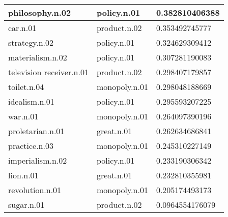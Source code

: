 \begin{center}
\begin{tabular}{ | l | l | l |}
philosophy.n.02 & policy.n.01 & 0.382810406388\\ \hline
car.n.01 & product.n.02 & 0.353492745777\\ \hline
strategy.n.02 & policy.n.01 & 0.324629309412\\ \hline
materialism.n.02 & policy.n.01 & 0.307281190083\\ \hline
television receiver.n.01 & product.n.02 & 0.298407179857\\ \hline
toilet.n.04 & monopoly.n.01 & 0.298048188669\\ \hline
idealism.n.01 & policy.n.01 & 0.295593207225\\ \hline
war.n.01 & monopoly.n.01 & 0.264097390196\\ \hline
proletarian.n.01 & great.n.01 & 0.262634686841\\ \hline
practice.n.03 & monopoly.n.01 & 0.245310227149\\ \hline
imperialism.n.02 & policy.n.01 & 0.233190306342\\ \hline
lion.n.01 & great.n.01 & 0.232810355981\\ \hline
revolution.n.01 & monopoly.n.01 & 0.205174493173\\ \hline
sugar.n.01 & product.n.02 & 0.0964554176079\\ \hline
\end{tabular}
\end{center}
